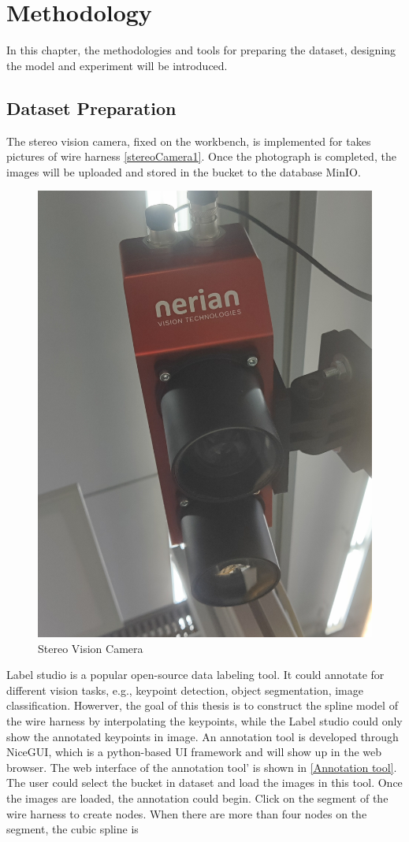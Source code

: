 \chapter{Methodology}
In this chapter, the methodologies and tools for preparing the dataset, designing the model and experiment will be introduced. 
\section{Dataset Preparation}
    The stereo vision camera, fixed on the workbench, is implemented for takes pictures of wire harness \autoref{stereoCamera1}. Once the photograph is completed, the images will be uploaded and stored 
    in the bucket to the database MinIO.
    \begin{figure}
        \centering
        \includegraphics[width=0.4\linewidth]{example_images/stereoCamera1.jpg}
        \caption{Stereo Vision Camera}
        \label{stereoCamera1}
    \end{figure}
    Label studio\cite{LabelStudio} is a popular open-source data labeling tool. It could annotate for different vision tasks, e.g., keypoint detection, object segmentation, image classification.
    Howerver, the goal of this thesis is to construct the spline model of the wire harness by interpolating the keypoints, while the Label studio could only show the annotated keypoints in image.
    An annotation tool is developed through NiceGUI\cite{schindler2024nicegui}, which is a python-based UI framework and will show up in the web browser. The web interface of the annotation tool'
    is shown in \autoref{Annotation tool}. The user could select the bucket in dataset and load the images in this tool. Once the images are loaded, the annotation could begin.
    Click on the segment of the wire harness to create nodes. When there are more than four nodes on the segment, the cubic spline is 
